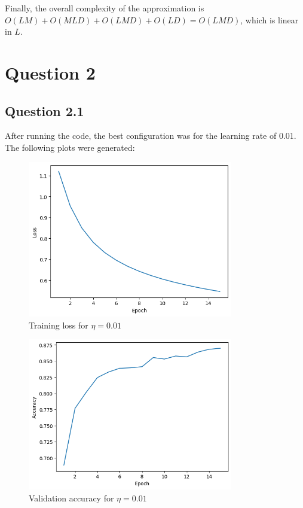 \documentclass{article}
\begin{document}
\bigskip

Finally, the overall complexity of the approximation is $O(L M) + O(M L D) + O(L M D) + O(L D) = O(L M D)$, which is linear in $L$.

\section{Question 2}

\subsection{Question 2.1}
After running the code, the best configuration was for the learning rate of 0.01.
The following plots were generated:

\begin{figure}[H]
    \centering
    \includegraphics[width=0.8\textwidth]{plots/CNN-training-loss-0.01-0.7-0-sgd-False.png}
    \caption{Training loss for $\eta=0.01$}
    \label{fig:2.1-training_loss}
\end{figure}

\begin{figure}[H]
    \centering
    \includegraphics[width=0.8\textwidth]{plots/CNN-validation-accuracy-0.01-0.7-0-sgd-False.png}
    \caption{Validation accuracy for $\eta=0.01$}
    \label{fig:2.1-validation_accuracy}
\end{figure}
\end{document}
